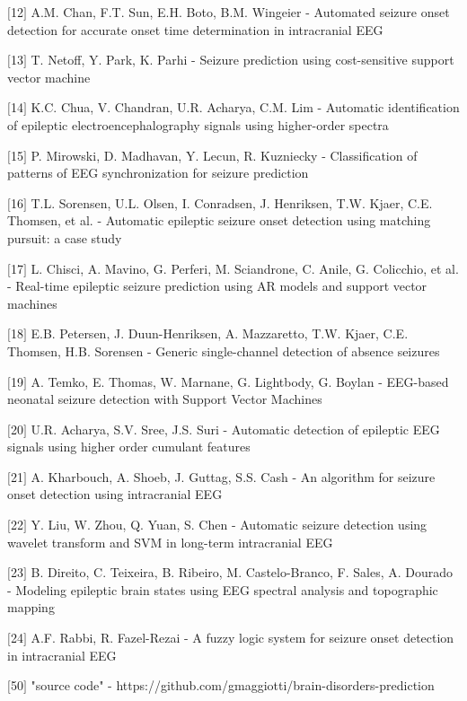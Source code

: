 \documentclass{llncs}       %
\begin{document}
\begin{thebibliography}{}
$[$12$]$ A.M. Chan, F.T. Sun, E.H. Boto, B.M. Wingeier - Automated 
seizure onset detection for accurate onset time determination in 
intracranial EEG

$[$13$]$ T. Netoff, Y. Park, K. Parhi - Seizure prediction using 
cost-sensitive support vector machine

$[$14$]$ K.C. Chua, V. Chandran, U.R. Acharya, C.M. Lim - Automatic 
identification of epileptic electroencephalography signals using 
higher-order spectra

$[$15$]$ P. Mirowski, D. Madhavan, Y. Lecun, R. Kuzniecky - 
Classification of patterns of EEG synchronization for seizure prediction

$[$16$]$ T.L. Sorensen, U.L. Olsen, I. Conradsen, J. Henriksen, T.W. 
Kjaer, C.E. Thomsen, et al. - Automatic epileptic seizure onset 
detection using matching pursuit: a case study

$[$17$]$ L. Chisci, A. Mavino, G. Perferi, M. Sciandrone, C. Anile, G. 
Colicchio, et al. - Real-time epileptic seizure prediction using AR 
models and support vector machines

$[$18$]$ E.B. Petersen, J. Duun-Henriksen, A. Mazzaretto, T.W. Kjaer, 
C.E. Thomsen, H.B. Sorensen - Generic single-channel detection of 
absence seizures

$[$19$]$ A. Temko, E. Thomas, W. Marnane, G. Lightbody, G. Boylan - 
EEG-based neonatal seizure detection with Support Vector Machines

$[$20$]$ U.R. Acharya, S.V. Sree, J.S. Suri - Automatic detection of 
epileptic EEG signals using higher order cumulant features

$[$21$]$ A. Kharbouch, A. Shoeb, J. Guttag, S.S. Cash - An algorithm for 
seizure onset detection using intracranial EEG

$[$22$]$ Y. Liu, W. Zhou, Q. Yuan, S. Chen - Automatic seizure detection 
using wavelet transform and SVM in long-term intracranial EEG

$[$23$]$ B. Direito, C. Teixeira, B. Ribeiro, M. Castelo-Branco, F. 
Sales, A. Dourado - Modeling epileptic brain states using EEG spectral 
analysis and topographic mapping

$[$24$]$ A.F. Rabbi, R. Fazel-Rezai - A fuzzy logic system for seizure 
onset detection in intracranial EEG

$[$50$]$ "source code" - https://github.com/gmaggiotti/brain-disorders-prediction





\end{thebibliography}
\end{document}
